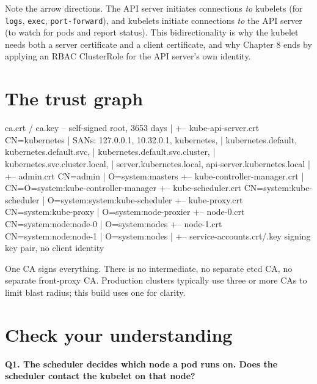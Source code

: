 \documentclass[11pt,oneside]{report}
\begin{document}
Note the arrow
directions. The API
server initiates
connections
\emph{to} kubelets
(for \texttt{logs},
\texttt{exec},
\texttt{port-forward}),
and kubelets
initiate connections
\emph{to} the API
server (to watch for
pods and report
status). This
bidirectionality is
why the kubelet
needs both a server
certificate and a
client certificate,
and why Chapter 8
ends by applying an
RBAC ClusterRole for
the API server's own
identity.

\hypertarget{the-trust-graph}{%
\section{The trust
graph}\label{the-trust-graph}}

\begin{outlst}
  ca.crt / ca.key  --  self-signed root, 3653 days
     |
     +-- kube-api-server.crt   CN=kubernetes
     |     SANs: 127.0.0.1, 10.32.0.1, kubernetes,
     |           kubernetes.default, kubernetes.default.svc,
     |           kubernetes.default.svc.cluster,
     |           kubernetes.svc.cluster.local,
     |           server.kubernetes.local, api-server.kubernetes.local
     |
     +-- admin.crt             CN=admin
     |                         O=system:masters
     +-- kube-controller-manager.crt
     |                         CN=O=system:kube-controller-manager
     +-- kube-scheduler.crt    CN=system:kube-scheduler
     |                         O=system:system:kube-scheduler
     +-- kube-proxy.crt        CN=system:kube-proxy
     |                         O=system:node-proxier
     +-- node-0.crt            CN=system:node:node-0
     |                         O=system:nodes
     +-- node-1.crt            CN=system:node:node-1
     |                         O=system:nodes
     |
     +-- service-accounts.crt/.key   signing key pair, no client identity
\end{outlst}

One CA signs
everything. There is
no intermediate, no
separate etcd CA, no
separate front-proxy
CA. Production
clusters typically
use three or more
CAs to limit blast
radius; this build
uses one for
clarity.

\hypertarget{check-your-understanding}{%
\section{Check your
understanding}\label{check-your-understanding}}

\textbf{Q1. The
scheduler decides
which node a pod
runs on. Does the
scheduler contact
the kubelet on that
node?}
\end{document}
